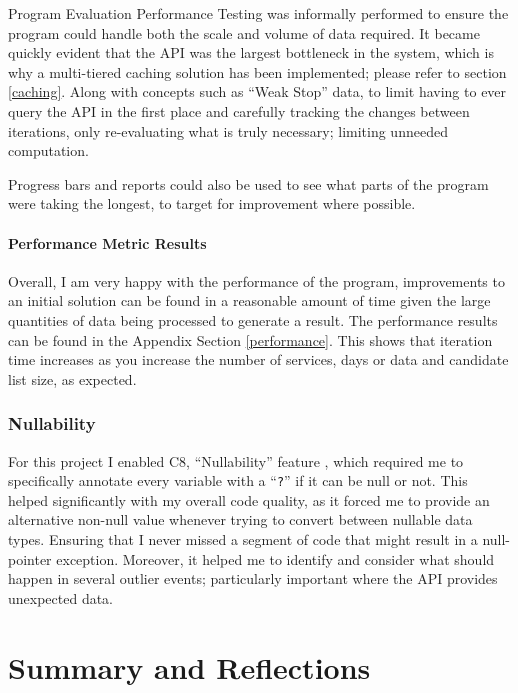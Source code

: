 \documentclass{article}
\newcommand{\CS}{C\nolinebreak\hspace{-.05em}\raisebox{.6ex}{\tiny\bf \#}}
\begin{document}
\par 
Program Evaluation Performance Testing was informally performed to ensure the program could handle both the scale and volume of data required. It became quickly evident that the API was the largest bottleneck in the system, which is why a multi-tiered caching solution has been implemented; please refer to section \ref{caching}. Along with concepts such as ``Weak Stop'' data, to limit having to ever query the API in the first place and carefully tracking the changes between iterations, only re-evaluating what is truly necessary; limiting unneeded computation.

\par 
Progress bars and reports could also be used to see what parts of the program were taking the longest, to target for improvement where possible. 

\paragraph{Performance Metric Results}

Overall, I am very happy with the performance of the program, improvements to an initial solution can be found in a reasonable amount of time given the large quantities of data being processed to generate a result. The performance results can be found in the Appendix Section \ref{performance}. This shows that iteration time increases as you increase the number of services, days or data and candidate list size, as expected.


\subsubsection{Nullability}
\label{null}
For this project I enabled \CS 8, ``Nullability'' feature \cite{RN41}, which required me to specifically annotate every variable with a ``\texttt{?}'' if it can be null or not. This helped significantly with my overall code quality, as it forced me to provide an alternative non-null value whenever trying to convert between nullable data types. Ensuring that I never missed a segment of code that might result in a null-pointer exception. Moreover, it helped me to identify and consider what should happen in several outlier events; particularly important where the API provides unexpected data. 





\section{Summary and Reflections}
\end{document}
